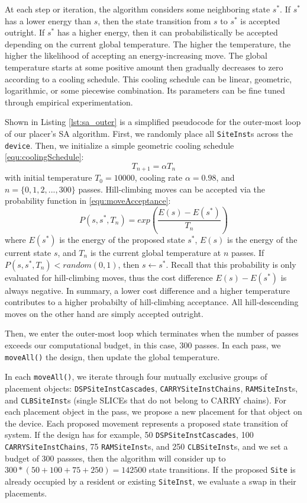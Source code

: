 At each step or iteration, the algorithm considers some neighboring state \(s^*\). 
If \(s^*\) has a lower energy than \(s\), then the state transition from \(s\) to \(s^*\) is accepted outright.
If \(s^*\) has a higher energy, then it can probabilistically be accepted depending on the current global temperature.
The higher the temperature, the higher the likelihood of accepting an energy-increasing move. 
The global temperature starts at some positive amount then gradually decreases to zero according to a cooling schedule.
This cooling schedule can be linear, geometric, logarithmic, or some piecewise combination. 
Its parameters can be fine tuned through empirical experimentation. 

Shown in Listing \ref{lst:sa_outer} is a simplified pseudocode for the outer-most loop of our placer's SA algorithm. 
First, we randomly place all \texttt{SiteInst}s across the \texttt{device}.
Then, we initialize a simple geometric cooling schedule \ref{equ:coolingSchedule}: 
\begin{equation}
    \label{equ:coolingSchedule}
    T_{n+1} = \alpha T_n
\end{equation}
with initial temperature \(T_0=10000\), cooling rate \(\alpha=0.98\), and \(n = \{0, 1, 2, ..., 300\}\) passes.
Hill-climbing moves can be accepted via the probability function in \ref{equ:moveAcceptance}: 
\begin{equation}
    \label{equ:moveAcceptance}
    P(s, s^*, T_n) = exp(\frac{E(s) - E(s^*)}{T_n})
\end{equation}
where \(E(s^*)\) is the energy of the proposed state \(s^*\), \(E(s)\) is the energy of the current state \(s\), and \(T_n\) is the current global temperature at \(n\) passes. 
If \(P(s, s^*, T_n) < random(0, 1)\), then \(s \leftarrow s^*\).
Recall that this probability is only evaluated for hill-climbing moves, thus the cost difference \(E(s) - E(s^*)\) is always negative.
In summary, a lower cost difference and a higher temperature contributes to a higher probabilty of hill-climbing acceptance.
All hill-descending moves on the other hand are simply accepted outright. 

Then, we enter the outer-most loop which terminates when the number of passes exceeds our computational budget, in this case, 300 passes. 
In each pass, we \texttt{moveAll()} the design, then update the global temperature. 

In each \texttt{moveAll()}, we iterate through four mutually exclusive groups of placement objects: \texttt{DSPSiteInstCascades}, \texttt{CARRYSiteInstChains}, \texttt{RAMSiteInst}s, and \texttt{CLBSiteInst}s (single SLICEs that do not belong to CARRY chains).
For each placement object in the pass, we propose a new placement for that object on the device. 
Each proposed movement represents a proposed state transition of system. 
If the design has for example, 50 \texttt{DSPSiteInstCascades}, 100 \texttt{CARRYSiteInstChains}, 75 \texttt{RAMSiteInst}s, and 250 \texttt{CLBSiteInst}s, and we set a budget of 300 passses, then the algorithm will consider up to \(300 * (50 + 100 + 75 + 250) = 142500\) state transitions. 
If the proposed \texttt{Site} is already occupied by a resident or existing \texttt{SiteInst}, we evaluate a swap in their placements. 

